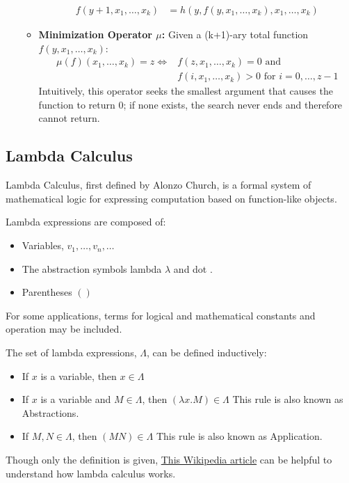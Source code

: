 \documentclass{report}
\begin{document}
\begin{defn}
\begin{itemize}
\begin{itemize}
\begin{align*}
								f(y+1,x_1,\dots,x_k)&=h(y,f(y,x_1,\dots,x_k),x_1,\dots,x_k)
							\end{align*}
							\item \textbf{Minimization Operator $\mu$:} Given a (k+1)-ary total function $f(y,x_1,\dots,x_k)$:
							\begin{align*}
								\mu (f)(x_1,\dots,x_k)=z \Leftrightarrow& f(z,x_1,\dots,x_k)=0 \text{   and}\\&f(i,x_1,\dots,x_k)>0 \text{   for   } i=0,\dots,z-1
							\end{align*}
								\subitem Intuitively, this operator seeks the smallest argument that causes the function to return 0; if none exists, the search never ends and therefore cannot return.
						\end{itemize}
					\end{itemize}
				\end{defn}
			
			\subsection{Lambda Calculus}
				Lambda Calculus, first defined by Alonzo Church, is a formal system of mathematical logic for expressing computation based on function-like objects.
				\begin{defn} \label{def_lambda_expression}
					Lambda expressions are composed of:
					\begin{itemize}
						\item Variables, $v_1,\dots,v_n,\dots$
						\item The abstraction symbols lambda $\lambda$ and dot $.$
						\item Parentheses $( )$
					\end{itemize}
					For some applications, terms for logical and mathematical constants and operation may be included.
					
					The set of lambda expressions, $\Lambda$, can be defined inductively:
					\begin{itemize}
						\item If $x$ is a variable, then $x \in \Lambda$
						\item If $x$ is a variable and $M \in \Lambda$, then $(\lambda x.M)\in \Lambda$
							\subitem This rule is also known as Abstractions.
						\item If $M,N \in \Lambda$, then $(M N) \in \Lambda$
							\subitem This rule is also known as Application.
					\end{itemize}
				\end{defn}
				Though only the definition is given, \href{https://en.wikipedia.org/wiki/Lambda_calculus#Formal_definition}{This Wikipedia article} can be helpful to understand how lambda calculus works.
			
\end{document}
